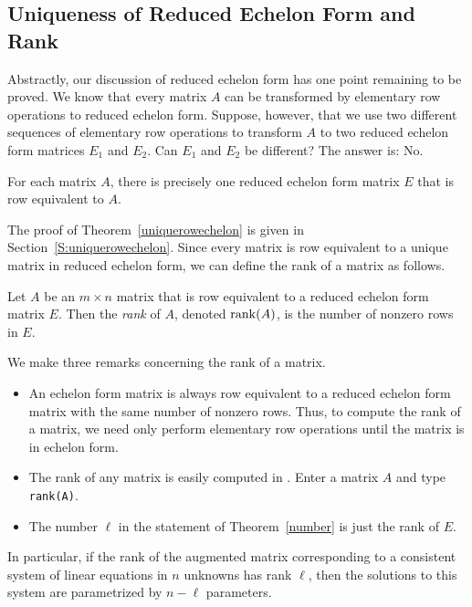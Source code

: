 \subsection*{Uniqueness of Reduced Echelon Form and Rank}

Abstractly, our discussion of reduced echelon form has one point
remaining to be proved.  We know that every matrix $A$ can be
transformed by elementary row operations to reduced echelon
form.  Suppose, however, that we use two different sequences of
elementary row operations to transform $A$ to two reduced
echelon form matrices $E_1$ and $E_2$.  Can $E_1$ and $E_2$ be
different?  The answer is: No.

\begin{thm} \label{uniquerowechelon}
For each matrix $A$, there is precisely one reduced echelon form
matrix $E$ that is row equivalent  to $A$.
\end{thm}

The proof of Theorem~\ref{uniquerowechelon} is given in 
Section~\ref{S:uniquerowechelon}.  Since every matrix is row equivalent 
to a unique matrix in reduced echelon form, we can define the rank 
of a matrix as follows.
\begin{Def}  \label{D:rank}
Let $A$ be an $m\times n$ matrix that is row equivalent to a
reduced echelon form matrix $E$.  Then the {\em rank\/} of $A$,
denoted ${\rm rank}(A)$, is the number of nonzero rows in $E$.
\end{Def}  

We make three remarks concerning the rank of a matrix.
\begin{itemize}
\item An echelon form matrix is always row equivalent to a
reduced echelon form matrix with the same number of nonzero
rows.  Thus, to compute the rank of a matrix, we need only
perform elementary row operations until the matrix is in echelon
form.
\item	The rank of any matrix is easily computed in \Matlabp.
Enter a matrix $A$ and type {\tt rank(A)}.
\item The number $\ell$ in the statement of Theorem~\ref{number}
is just the rank of $E$.
\end{itemize}
In particular, if the rank of the augmented matrix corresponding to
a consistent system of linear equations in $n$ unknowns has rank $\ell$,
then the solutions to this system are parametrized by $n-\ell$ parameters.


